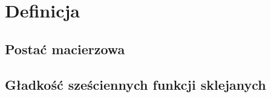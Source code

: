 \section{Definicja}
\label{sekcja2:definicja}
\subsection{Postać macierzowa}
\label{sekcja2.1:postac_macierzowa}
\subsection{Gładkość sześciennych funkcji sklejanych}
\label{sekcja2.2:gladkosc}
